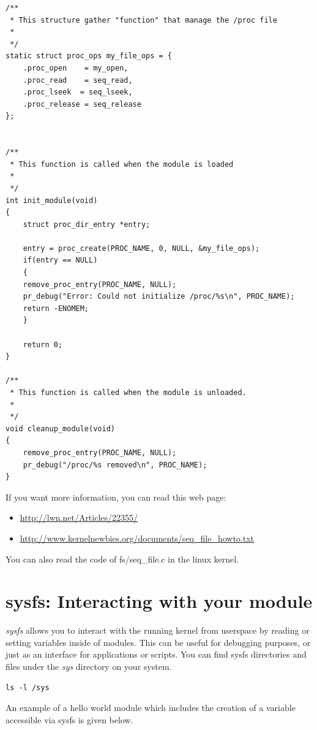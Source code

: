 \documentclass[11pt]{article}
\begin{document}
\begin{verbatim}
/**
 * This structure gather "function" that manage the /proc file
 *
 */
static struct proc_ops my_file_ops = {
    .proc_open    = my_open,
    .proc_read    = seq_read,
    .proc_lseek  = seq_lseek,
    .proc_release = seq_release
};


/**
 * This function is called when the module is loaded
 *
 */
int init_module(void)
{
    struct proc_dir_entry *entry;

    entry = proc_create(PROC_NAME, 0, NULL, &my_file_ops);
    if(entry == NULL)
    {
	remove_proc_entry(PROC_NAME, NULL);
	pr_debug("Error: Could not initialize /proc/%s\n", PROC_NAME);
	return -ENOMEM;
    }

    return 0;
}

/**
 * This function is called when the module is unloaded.
 *
 */
void cleanup_module(void)
{
    remove_proc_entry(PROC_NAME, NULL);
    pr_debug("/proc/%s removed\n", PROC_NAME);
}
\end{verbatim}

If you want more information, you can read this web page:

\begin{itemize}
\item \url{http://lwn.net/Articles/22355/}

\item \url{http://www.kernelnewbies.org/documents/seq\_file\_howto.txt}
\end{itemize}


You can also read the code of fs/seq\_file.c in the linux kernel.

\section{sysfs: Interacting with your module}
\label{sec:orgdb0ef18}
\emph{sysfs} allows you to interact with the running kernel from userspace by reading or setting variables inside of modules. This can be useful for debugging purposes, or just as an interface for applications or scripts. You can find sysfs directories and files under the \emph{sys} directory on your system.

\begin{verbatim}
ls -l /sys
\end{verbatim}

An example of a hello world module which includes the creation of a variable accessible via sysfs is given below.
\end{document}
